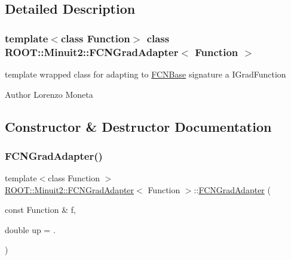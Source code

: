 \subsection{Detailed Description}
\subsubsection*{template$<$class Function$>$\newline
class R\+O\+O\+T\+::\+Minuit2\+::\+F\+C\+N\+Grad\+Adapter$<$ Function $>$}

template wrapped class for adapting to \mbox{\hyperlink{classROOT_1_1Minuit2_1_1FCNBase}{F\+C\+N\+Base}} signature a I\+Grad\+Function

\begin{DoxyAuthor}{Author}
Lorenzo Moneta 
\end{DoxyAuthor}


\subsection{Constructor \& Destructor Documentation}
\mbox{\label{classROOT_1_1Minuit2_1_1FCNGradAdapter_a1836db737b7f09a9acc99b9206abed81}} 
\subsubsection{\texorpdfstring{FCNGradAdapter()}{FCNGradAdapter()}\hspace{0.1cm}{\footnotesize\ttfamily [1/3]}}
{\footnotesize\ttfamily template$<$class Function $>$ \\
\mbox{\hyperlink{classROOT_1_1Minuit2_1_1FCNGradAdapter}{R\+O\+O\+T\+::\+Minuit2\+::\+F\+C\+N\+Grad\+Adapter}}$<$ Function $>$\+::\mbox{\hyperlink{classROOT_1_1Minuit2_1_1FCNGradAdapter}{F\+C\+N\+Grad\+Adapter}} (\begin{DoxyParamCaption}\item[{const Function \&}]{f,  }\item[{double}]{up = {.} }\end{DoxyParamCaption})\hspace{0.3cm}{\ttfamily [inline]}}

\mbox{\label{classROOT_1_1Minuit2_1_1FCNGradAdapter_a7b15e8e6baa870bc150e04cb4a5ad946}} 
